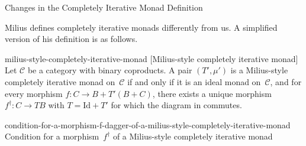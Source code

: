\documentclass[copyright,creativecommons]{eptcs}
\newcommand{\edges}{\AtBeginMath\scriptstyle}
\newcommand{\id}{\mathrm{id}}
\newcommand{\Id}{\mathrm{Id}}
\begin{document}
            {Changes in the Completely Iterative Monad Definition}

Milius \cite[Definition~5.5]{milius:ic-196-1} defines completely iterative
monads differently from us. A simplified version of his definition is as
follows.

\begin{extdefinition}{milius-style-completely-iterative-monad}
                     [Milius-style completely iterative monad]
Let $𝒞$ be a category with binary coproducts. A pair $(T′, μ′)$ is a
Milius-style completely iterative monad on~$𝒞$ if and only if it is an ideal
monad on~$𝒞$, and for every morphism $f : C → B + T′(B + C)$, there exists a
unique morphism $f^† : C → TB$ with $T = \Id + T′$ for which the diagram in
commutes.
\end{extdefinition}
\begin{extfigure}{condition-for-a-morphism-f-dagger-of-a-milius-style-completely-iterative-monad}
                 {Condition for a morphism~$f^†$ of a Milius-style completely iterative monad}


\end{extfigure}
\end{document}
